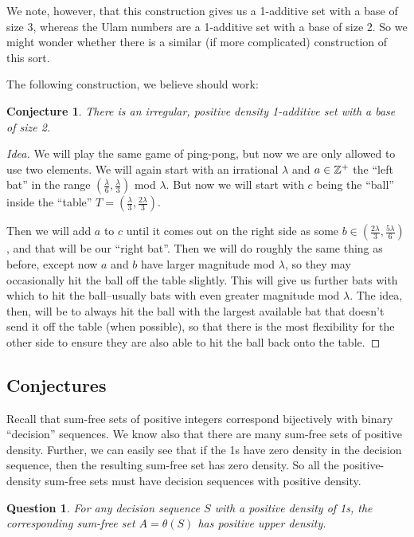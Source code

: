 \documentclass{report}
\newtheorem{conjecture}[theorem]{Conjecture}
\newtheorem{question}[theorem]{Question}
\theoremstyle{remark}
\numberwithin{equation}{section}
\begin{document}
We note, however, that this construction gives us a 1-additive set
with a base of size 3, whereas the Ulam numbers are a 1-additive set
with a base of size 2.  So we might wonder whether there is a similar
(if more complicated) construction of this sort.

The following construction, we believe should work: 

\begin{conjecture}
  There is an irregular, positive density 1-additive set with a base
  of size 2.
\end{conjecture}

\begin{proof}[Idea]
  We will play the same game of ping-pong, but now we are only allowed
  to use two elements.  We will again start with an irrational
  $\lambda$ and $a \in \mathbb{Z}^+$ the ``left bat'' in the range
  $(\frac{\lambda}{6}, \frac{\lambda}{3})$ mod $\lambda$.  But now we
  will start with $c$ being the ``ball'' inside the ``table''
  $T = (\frac{\lambda}{3}, \frac{2\lambda}{3})$.

  Then we will add $a$ to $c$ until it comes out on the right side as
  some $b \in (\frac{2\lambda}{3}, \frac{5\lambda}{6})$, and that will
  be our ``right bat''.  Then we will do roughly the same thing as
  before, except now $a$ and $b$ have larger magnitude mod $\lambda$,
  so they may occasionally hit the ball off the table slightly.  This
  will give us further bats with which to hit the ball--usually bats
  with even greater magnitude mod $\lambda$.  The idea, then, will be
  to always hit the ball with the largest available bat that doesn't
  send it off the table (when possible), so that there is the most
  flexibility for the other side to ensure they are also able to hit
  the ball back onto the table.  
\end{proof}

\subsection{Conjectures}

Recall that sum-free sets of positive integers correspond bijectively
with binary ``decision'' sequences.  We know also that there are many
sum-free sets of positive density.  Further, we can easily see that if
the 1s have zero density in the decision sequence, then the resulting
sum-free set has zero density.  So all the positive-density sum-free
sets must have decision sequences with positive density.  

\begin{question}
  For any decision sequence $S$ with a positive density of 1s, the
  corresponding sum-free set $A = \theta(S)$ has positive upper density.
\end{question}
\end{document}
